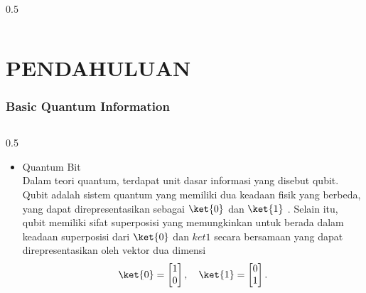 \begin{frame}
\begin{columns}
\begin{column}{0.5\textwidth}
\begin{itemize}
\end{itemize}
  
    \end{column}
   \end{columns}   
\end{frame}


\section{PENDAHULUAN}
\begin{frame}
\frametitle{Basic Quantum Information}
    \begin{columns}
        \begin{column}{0.5\textwidth}
            \begin{itemize}\tiny 
                \item Quantum Bit \\
                    \justifying 
                    Dalam teori quantum, terdapat unit dasar informasi yang disebut qubit. Qubit adalah sistem quantum yang memiliki dua keadaan fisik yang berbeda, yang dapat direpresentasikan sebagai \(\ket{0}\) dan \(\ket{1}\) \cite{barnett2009quantum}. Selain itu, qubit memiliki sifat superposisi yang memungkinkan untuk berada dalam keadaan superposisi dari \(\ket{0}\) dan \(ket{1}\) secara bersamaan yang dapat direpresentasikan oleh vektor dua dimensi
                        \begin{equation}
                            \ket{0} = 
                                        \begin{bmatrix}
                                            1 \\
                                            0
                                        \end{bmatrix},
                            \quad
                            \ket{1} = 
                                        \begin{bmatrix}
                                            0 \\
                                            1
                                        \end{bmatrix}.
                            \label{eq:ketket0}
                        \end{equation}
                

\end{itemize}
\end{column}
\end{columns}
\end{frame}
